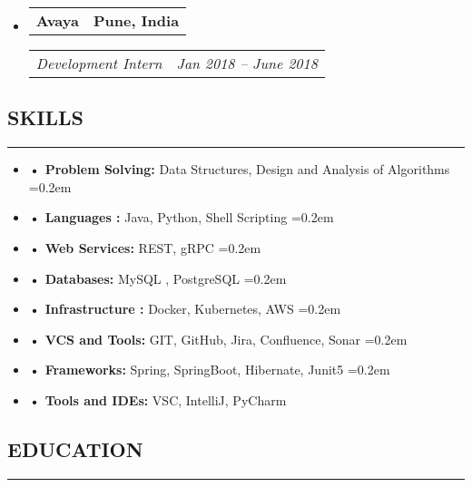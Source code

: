 \documentclass[a4paper]{article}
\makeatletter
\newcommand{\headerrow}[2]
{\begin{tabular*}{\linewidth}{l@{\extracolsep{\fill}}r}
#1 &
#2 \\
\end{tabular*}}
\makeatother
\begin{document}
\begin{itemize}[leftmargin=1em]
	      
	      	      	      
	\item
	      \headerrow
	      {\textbf{ Avaya }}
	      {\textbf{Pune, India}}
	      \headerrow
	      {\emph{Development Intern}}
	      {\emph{Jan 2018 -- June 2018}}
	      	      	      
\end{itemize}


\subsection*{\large SKILLS}
\hrule
\vspace{1em}

\begin{itemize} [leftmargin=1em,noitemsep]
    \parskip=0.2em
	\item \textbf{• Problem Solving: }
	     Data Structures, Design and Analysis of Algorithms
	     \parskip=0.2em
	\item \textbf{• Languages :}
	      Java, Python, Shell  Scripting
	      \parskip=0.2em
	\item \textbf{• Web Services:}
	      REST, gRPC
	      \parskip=0.2em
	\item \textbf{• Databases: }
	      MySQL , PostgreSQL
	      \parskip=0.2em
	\item \textbf{• Infrastructure :}
	      Docker, Kubernetes, AWS
	      \parskip=0.2em
	\item \textbf{• VCS and Tools:}
    	  GIT, GitHub, Jira, Confluence, Sonar
    \parskip=0.2em
	\item \textbf{• Frameworks:}
	      Spring, SpringBoot, Hibernate, Junit5
	\parskip=0.2em
	\item \textbf{• Tools and IDEs:}
	   VSC, IntelliJ, PyCharm

\end{itemize}


\subsection*{\large EDUCATION}
\hrule
\vspace{1em}
\end{document}
